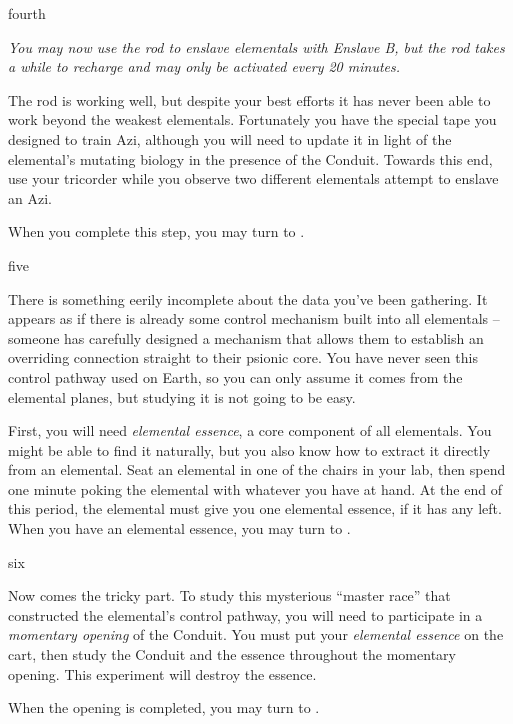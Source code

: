 \documentclass[notebook]{elementals}
\begin{document}
\begin{page}{fourth}

\emph{You may now use the rod to enslave elementals with Enslave B, but the rod takes a while to recharge and may only be activated every 20 minutes.}

The rod is working well, but despite your best efforts it has never been able to work beyond the weakest elementals. Fortunately you have the special tape you designed to train Azi, although you will need to update it in light of the elemental's mutating biology in the presence of the Conduit. Towards this end, use your tricorder while you observe two different elementals attempt to enslave an Azi.

When you complete this step, you may turn to .

\end{page}

\begin{page}{five}

There is something eerily incomplete about the data you've been gathering. It appears as if there is already some control mechanism built into all elementals -- someone has carefully designed a mechanism that allows them to establish an overriding connection straight to their psionic core. You have never seen this control pathway used on Earth, so you can only assume it comes from the elemental planes, but studying it is not going to be easy.

First, you will need \emph{elemental essence}, a core component of all elementals. You might be able to find it naturally, but you also know how to extract it directly from an elemental. Seat an elemental in one of the chairs in your lab, then spend one minute poking the elemental with whatever you have at hand. At the end of this period, the elemental must give you one elemental essence, if it has any left. When you have an elemental essence, you may turn to .

\end{page}

\begin{page}{six}

Now comes the tricky part. To study this mysterious ``master race'' that constructed the elemental's control pathway, you will need to participate in a \emph{momentary opening} of the Conduit. You must put your \emph{elemental essence} on the cart, then study the Conduit and the essence throughout the momentary opening. This experiment will destroy the essence.

When the opening is completed, you may turn to .

\end{page}
\end{document}
